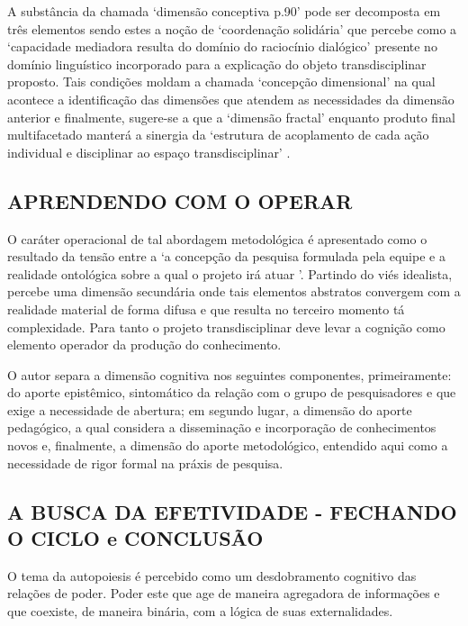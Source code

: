 \documentclass[
   article,       %
   12pt,          %
   oneside,       %
   a4paper,       %
   english,       %
   brazil,           %
   sumario=tradicional
   ]{abntex2}
\begin{document}
A substância da chamada ‘dimensão conceptiva p.90’ pode ser decomposta em três elementos sendo estes a noção de ‘coordenação solidária’ que percebe como a ‘capacidade mediadora resulta do domínio do raciocínio dialógico’ presente no domínio linguístico incorporado para a explicação do objeto transdisciplinar proposto. Tais condições moldam a chamada ‘concepção dimensional’ na qual acontece a identificação das dimensões que atendem as necessidades da dimensão anterior e finalmente, sugere-se a que a ‘dimensão fractal’ enquanto produto final multifacetado manterá a sinergia da ‘estrutura
de acoplamento de cada ação individual e disciplinar ao espaço transdisciplinar' \cite[p. 90]{Paradigma_Transdisciplinar_Metodologica}.


\subsection{APRENDENDO COM O OPERAR}

O caráter operacional de tal abordagem metodológica é apresentado como o resultado da tensão entre a ‘a concepção da pesquisa formulada pela equipe e a realidade
ontológica sobre a qual o projeto irá atuar \cite[p. 90]{Paradigma_Transdisciplinar_Metodologica}’. Partindo do viés idealista, percebe uma dimensão secundária onde tais elementos abstratos convergem com a realidade material de forma difusa e que resulta no terceiro momento tá complexidade. Para tanto o projeto transdisciplinar deve levar a cognição como elemento operador da produção do conhecimento.

O autor separa a dimensão cognitiva nos seguintes componentes, primeiramente: do aporte epistêmico, sintomático da relação com o grupo de pesquisadores e que exige a necessidade de abertura; em segundo lugar, a dimensão do aporte pedagógico, a qual considera a disseminação e incorporação de conhecimentos novos e, finalmente, a dimensão do aporte metodológico, entendido aqui como a necessidade de rigor formal na práxis de pesquisa.


\subsection{A BUSCA DA EFETIVIDADE - FECHANDO O CICLO e CONCLUSÃO}

O tema da autopoiesis é percebido como um desdobramento cognitivo das relações de poder. Poder este que age de maneira agregadora de informações e que coexiste, de maneira binária, com a lógica de suas externalidades.
\end{document}
